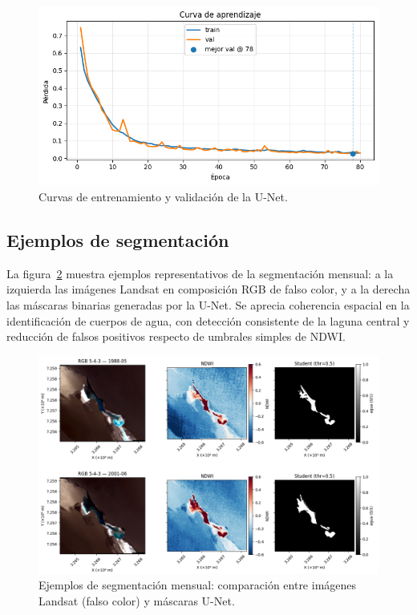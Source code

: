 \begin{figure}[H]
    \centering
    \includegraphics[scale=0.55]{Figures/curva_entrenamiento.png}
    \caption{Curvas de entrenamiento y validación de la U-Net.}
    \label{fig:unet_training}
\end{figure}

\subsection{Ejemplos de segmentación}
La figura~\ref{fig:unet_examples} muestra ejemplos representativos de la segmentación mensual: a la izquierda las imágenes Landsat en composición RGB de falso color, y a la derecha las máscaras binarias generadas por la U-Net. Se aprecia coherencia espacial en la identificación de cuerpos de agua, con detección consistente de la laguna central y reducción de falsos positivos respecto de umbrales simples de NDWI.

\begin{figure}[H]
    \centering
    \includegraphics[scale=0.32]{Figures/unet_examples.png}
    \caption{Ejemplos de segmentación mensual: comparación entre imágenes Landsat (falso color) y máscaras U-Net.}
    \label{fig:unet_examples}
\end{figure}

